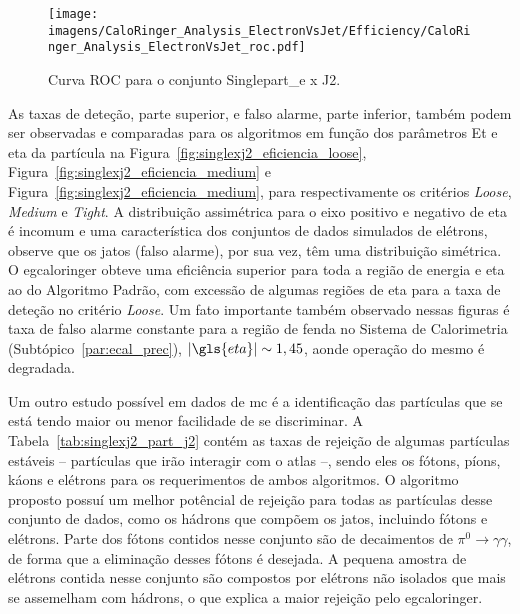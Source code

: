 \begin{figure}[ht]
\centering
\texttt{[image: imagens/CaloRinger\_Analysis\_ElectronVsJet/Efficiency/CaloRinger\_Analysis\_ElectronVsJet\_roc.pdf]}
\caption{Curva ROC para o conjunto Singlepart\_e x J2.}
\label{fig:singlexj2_roc}
\end{figure}

As taxas de deteção, parte superior, e falso alarme, parte inferior, também podem ser 
observadas e comparadas para os algoritmos em função dos parâmetros \gls{Et} e \gls{eta} 
da partícula na Figura~\ref{fig:singlexj2_eficiencia_loose},
Figura~\ref{fig:singlexj2_eficiencia_medium} e Figura~\ref{fig:singlexj2_eficiencia_medium}, 
para respectivamente os critérios \emph{Loose}, \emph{Medium} e \emph{Tight}. A
distribuição assimétrica para o eixo positivo e negativo de \gls{eta} é incomum
e uma característica dos conjuntos de dados simulados de elétrons, observe que
os jatos (falso alarme), por sua vez, têm uma distribuição simétrica. O
\gls{egcaloringer} obteve uma eficiência superior para toda a região de energia
e \gls{eta} ao do Algoritmo Padrão, com excessão de algumas regiões de \gls{eta}
para a taxa de deteção no critério \emph{Loose}. Um fato importante também
observado nessas figuras é taxa de falso alarme constante para a região de fenda
no Sistema de Calorimetria (Subtópico~\ref{par:ecal_prec}), $|\gls{eta}|\sim1,45$, 
aonde operação do mesmo é degradada.

Um outro estudo possível em dados de \gls{mc} é a identificação das partículas
que se está tendo maior ou menor facilidade de se discriminar. A
Tabela~\ref{tab:singlexj2_part_j2} contém as taxas de rejeição de algumas
partículas estáveis -- partículas que irão interagir com o \gls{atlas} --, sendo
eles os fótons, píons, káons e elétrons para os requerimentos de ambos
algoritmos. O algoritmo proposto possuí um melhor potêncial de rejeição para
todas as partículas desse conjunto de dados, como os hádrons que compõem os
jatos, incluindo fótons e elétrons. Parte dos fótons contidos nesse
conjunto são de decaimentos de $\pi^0\rightarrow\gamma\gamma$, de forma que a
eliminação desses fótons é desejada. A pequena amostra de elétrons contida nesse
conjunto são compostos por elétrons não isolados que mais se assemelham com
hádrons, o que explica a maior rejeição pelo \gls{egcaloringer}.

